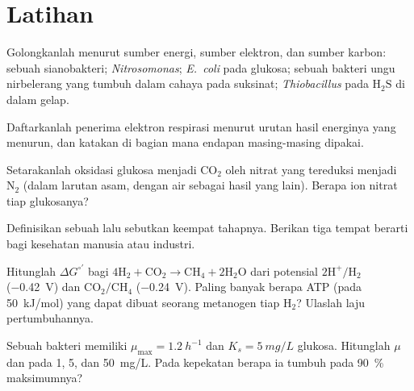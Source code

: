 \section{Latihan}

\begin{exercise}[$\star$]\label{exo:b2:microbial-metabolism:1}
Golongkanlah menurut sumber energi, sumber elektron, dan sumber karbon:
sebuah sianobakteri; \emph{Nitrosomonas}; \emph{E.~coli} pada glukosa;
sebuah bakteri ungu nirbelerang yang tumbuh dalam cahaya pada suksinat;
\emph{Thiobacillus} pada $\mathrm{H_2S}$ di dalam gelap.
\end{exercise}

\begin{exercise}[$\star$]\label{exo:b2:microbial-metabolism:2}
Daftarkanlah penerima elektron respirasi menurut urutan hasil energinya
yang menurun, dan katakan di bagian mana endapan masing-masing dipakai.
\end{exercise}

\begin{exercise}[$\star$]\label{exo:b2:microbial-metabolism:3}
Setarakanlah oksidasi glukosa menjadi $\mathrm{CO_2}$ oleh nitrat yang
tereduksi menjadi $\mathrm{N_2}$ (dalam larutan asam, dengan air sebagai
hasil yang lain). Berapa ion nitrat tiap glukosanya?
\end{exercise}

\begin{exercise}[$\star$]\label{exo:b2:microbial-metabolism:4}
Definisikan sebuah  lalu sebutkan keempat tahapnya. Berikan tiga
tempat  berarti bagi kesehatan manusia atau industri.
\end{exercise}

\begin{exercise}[$\star\star$]\label{exo:b2:microbial-metabolism:5}
Hitunglah $\Delta G^{\circ\prime}$ bagi $4\mathrm{H_2} + \mathrm{CO_2}
\to \mathrm{CH_4} + 2\mathrm{H_2O}$ dari potensial
$\mathrm{2H^+/H_2}$ (\qty{-0.42}{V}) dan $\mathrm{CO_2/CH_4}$
(\qty{-0.24}{V}). Paling banyak berapa ATP (pada \qty{50}{kJ/mol}) yang
dapat dibuat seorang metanogen tiap $\mathrm{H_2}$? Ulaslah laju
pertumbuhannya.
\end{exercise}

\begin{exercise}[$\star\star$]\label{exo:b2:microbial-metabolism:6}
Sebuah bakteri memiliki $\mu_{\max} = \qty{1.2}{h^{-1}}$ dan $K_s =
\qty{5}{mg/L}$ glukosa. Hitunglah $\mu$ dan  pada
1, 5, dan \qty{50}{mg/L}. Pada kepekatan berapa ia tumbuh pada
\qty{90}{\%} maksimumnya?
\end{exercise}

